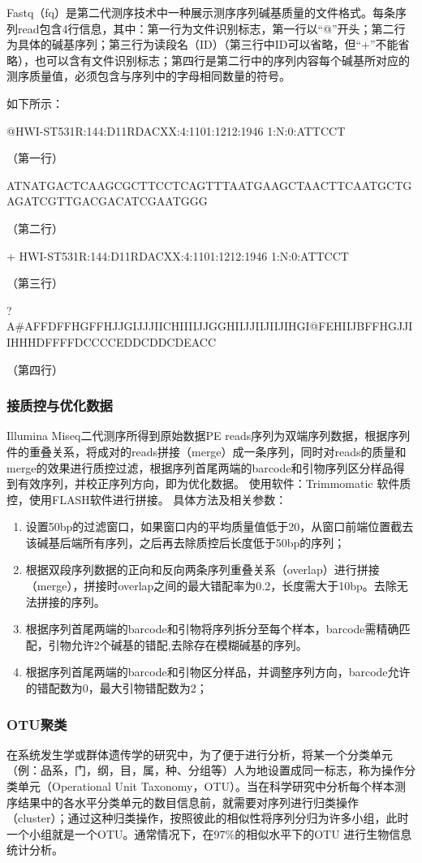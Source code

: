     Fastq（fq）是第二代测序技术中一种展示测序序列碱基质量的文件格式。每条序列read包含4行信息，其中：第一行为文件识别标志，第一行以“@”开头；第二行为具体的碱基序列；第三行为读段名（ID）（第三行中ID可以省略，但“+”不能省略），也可以含有文件识别标志；第四行是第二行中的序列内容每个碱基所对应的测序质量值，必须包含与序列中的字母相同数量的符号。

    如下所示：

    @HWI-ST531R:144:D11RDACXX:4:1101:1212:1946 1:N:0:ATTCCT

    （第一行）


    ATNATGACTCAAGCGCTTCCTCAGTTTAATGAAGCTAACTTCAATGCTGAGATCGTTGACGACATCGAATGGG

    （第二行）

    + HWI-ST531R:144:D11RDACXX:4:1101:1212:1946 1:N:0:ATTCCT

    （第三行）

    ?A\#AFFDFFHGFFHJJGIJJJIICHIIIIJJGGHIIJJIIJIIJIHGI@FEHIIJBFFHGJJIIHHHDFFFFDCCCCEDDCDDCDEACC

    （第四行）
    \subsubsection{接质控与优化数据}
    Illumina Miseq二代测序所得到原始数据PE reads序列为双端序列数据，根据序列件的重叠关系，将成对的reads拼接（merge）成一条序列，同时对reads的质量和merge的效果进行质控过滤，根据序列首尾两端的barcode和引物序列区分样品得到有效序列，并校正序列方向，即为优化数据。
    使用软件：Trimmomatic 软件质控，使用FLASH软件进行拼接。
    具体方法及相关参数：
      \begin{enumerate}
        \item 设置50bp的过滤窗口，如果窗口内的平均质量值低于20，从窗口前端位置截去该碱基后端所有序列，之后再去除质控后长度低于50bp的序列；
        \item  根据双段序列数据的正向和反向两条序列重叠关系（overlap）进行拼接（merge），拼接时overlap之间的最大错配率为0.2，长度需大于10bp。去除无法拼接的序列。
        \item 根据序列首尾两端的barcode和引物将序列拆分至每个样本，barcode需精确匹配，引物允许2个碱基的错配,去除存在模糊碱基的序列。
        \item 根据序列首尾两端的barcode和引物区分样品，并调整序列方向，barcode允许的错配数为0，最大引物错配数为2；
      \end{enumerate}
    \subsubsection{OTU聚类}
    在系统发生学或群体遗传学的研究中，为了便于进行分析，将某一个分类单元（例：品系，门，纲，目，属，种、分组等）人为地设置成同一标志，称为操作分类单元（Operational Unit Taxonomy，OTU）。当在科学研究中分析每个样本测序结果中的各水平分类单元的数目信息前，就需要对序列进行归类操作（cluster）；通过这种归类操作，按照彼此的相似性将序列分归为许多小组，此时一个小组就是一个OTU。通常情况下，在97\%的相似水平下的OTU 进行生物信息统计分析。

